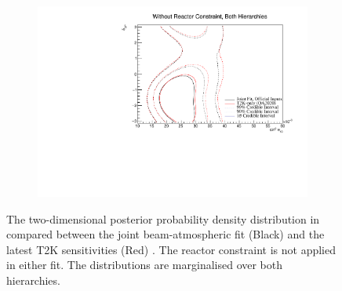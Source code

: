 \begin{figure}[h]
  \begin{subfigure}[t]{0.98\textwidth}
    \includegraphics[width=\textwidth, trim={0mm 0mm 0mm 0mm}, clip,page=1]{Figures/OA/JointFit_OA2020_Comp/ContourComparison_2D_th13_dcp_BH_0_woRC_UnSmeared_CredibleInterval.pdf}
  \end{subfigure}
  \caption{The two-dimensional posterior probability density distribution in  compared between the joint beam-atmospheric fit (Black) and the latest T2K sensitivities (Red) \cite{t2k_tn_399}. The reactor constraint is not applied in either fit. The distributions are marginalised over both hierarchies.}
  \label{fig:OscillationAnalysis_JointFit_OA2020_DCPTH13}
\end{figure}

